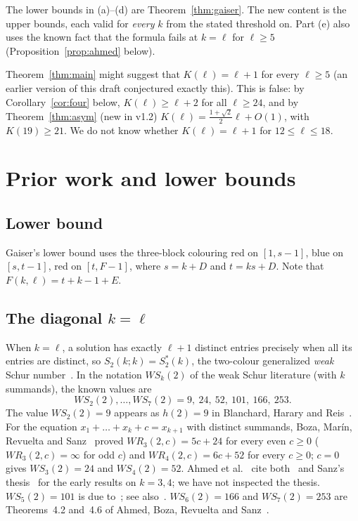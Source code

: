 \documentclass[11pt]{amsart}
\theoremstyle{definition}
\newcommand{\F}{F}
\newcommand{\Stwo}{S_2}
\begin{document}
The lower bounds in (a)--(d) are Theorem~\ref{thm:gaiser}. The new content is the upper bounds, each valid for \emph{every} $k$ from the stated threshold on. Part (e) also uses the known fact that the formula fails at $k=\ell$ for $\ell\ge5$ (Proposition~\ref{prop:ahmed} below).

\noindent Theorem~\ref{thm:main} might suggest that $K(\ell)=\ell+1$ for every $\ell\ge5$ (an earlier version of this draft conjectured exactly this). This is false: by Corollary~\ref{cor:four} below, $K(\ell)\ge\ell+2$ for all $\ell\ge24$, and by Theorem~\ref{thm:asym} (new in v1.2) $K(\ell)=\frac{1+\sqrt2}{2}\ell+O(1)$, with $K(19)\ge21$. We do not know whether $K(\ell)=\ell+1$ for $12\le\ell\le18$.

\section{Prior work and lower bounds}\label{sec:prior}

\subsection*{Lower bound} Gaiser's lower bound uses the three-block colouring red on $[1,s-1]$, blue on $[s,t-1]$, red on $[t,\F-1]$, where $s=k+D$ and $t=ks+D$. Note that $\F(k,\ell)=t+k-1+E$.

\subsection*{The diagonal $k=\ell$} When $k=\ell$, a solution has exactly $\ell+1$ distinct entries precisely when all its entries are distinct, so $\Stwo(k;k)=S_2^*(k)$, the two-colour generalized \emph{weak} Schur number~\cite{Gaiser}. In the notation $WS_k(2)$ of the weak Schur literature (with $k$ summands), the known values are
\[
WS_2(2),\dots,WS_7(2)=9,\ 24,\ 52,\ 101,\ 166,\ 253.
\]
The value $WS_2(2)=9$ appears as $h(2)=9$ in Blanchard, Harary and Reis~\cite{BHR}. For the equation $x_1+\dots+x_k+c=x_{k+1}$ with distinct summands, Boza, Mar\'in, Revuelta and Sanz~\cite{BMRS} proved $WR_3(2,c)=5c+24$ for every even $c\ge0$ ($WR_3(2,c)=\infty$ for odd $c$) and $WR_4(2,c)=6c+52$ for every $c\ge0$; $c=0$ gives $WS_3(2)=24$ and $WS_4(2)=52$. Ahmed et al.~\cite{ABRS} cite both~\cite{BMRS} and Sanz's thesis~\cite{Sanz} for the early results on $k=3,4$; we have not inspected the thesis. $WS_5(2)=101$ is due to~\cite{BMRS}; see also~\cite{BRS}. $WS_6(2)=166$ and $WS_7(2)=253$ are Theorems~4.2 and~4.6 of Ahmed, Boza, Revuelta and Sanz~\cite{ABRS}.
\end{document}
